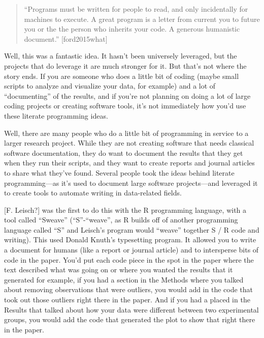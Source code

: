 \documentclass[]{tufte-book}
\begin{document}
\begin{quote}
``Programs must be written for people to read, and only incidentally for machines
to execute. A great program is a letter from current you to future you or
the the person who inherits your code. A generous humanistic document.'' {[}ford2015what{]}
\end{quote}

Well, this was a fantastic idea. It hasn't been universely leveraged, but the projects that
do leverage it are much stronger for it. But that's not where the story ends. If you are
someone who does a little bit of coding (maybe small scripts to analyze and visualize your
data, for example) and a lot of ``documenting'' of the results, and if you're not planning
on doing a lot of large coding projects or creating software tools, it's not immediately
how you'd use these literate programming ideas.

Well, there are many people who do a little bit of programming in service to a larger
research project. While they are not creating software that needs classical software
documentation, they do want to document the results that they get when they run their
scripts, and they want to create reports and journal articles to share what they've
found. Several people took the ideas behind literate programming---as it's used to
document large software projects---and leveraged it to create tools to automate
writing in data-related fields.

{[}F. Leisch?{]} was the first to do this with the R programming language, with a
tool called ``Sweave'' (``S''-``weave'', as R builds off of another programming
language called ``S'' and Leisch's program would ``weave'' together S / R code and
writing). This used Donald Knuth's typesetting program. It allowed you to write
a document for humans (like a report or journal article) and to intersperse bits
of code in the paper. You'd put each code piece in the spot in the paper where
the text described what was going on or where you wanted the results that it
generated for example, if you had a section in the Methods where you talked
about removing observations that were outliers, you would add in the code that
took out those outliers right there in the paper. And if you had a placed in the
Results that talked about how your data were different between two experimental
groups, you would add the code that generated the plot to show that right there
in the paper.
\end{document}

